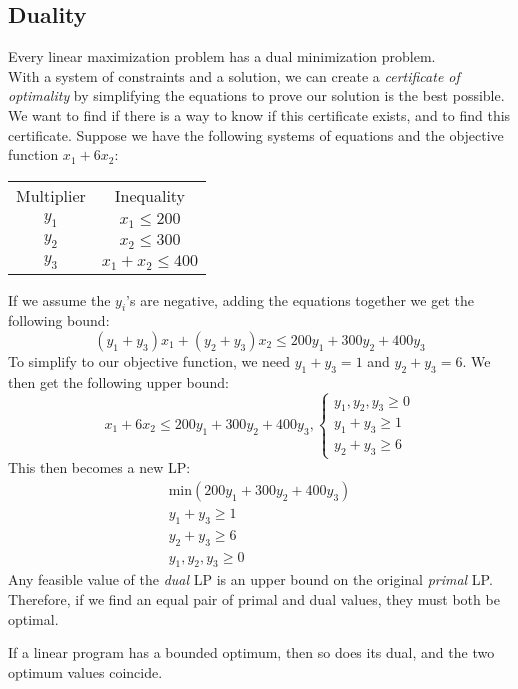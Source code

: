 \subsection{Duality}
Every linear maximization problem has a dual minimization problem.\\
With a system of constraints and a solution, we can create a \textit{certificate of optimality} by simplifying the equations to prove our solution is the best possible.
We want to find if there is a way to know if this certificate exists, and to find this certificate.
Suppose we have the following systems of equations and the objective function $x_1 + 6x_{2}$:
\begin{center}
\begin{tabular}{c c}
  Multiplier & Inequality \\
  $y_1$ & $x_1 \leq 200$\\
  $y_2$ & $x_2 \leq 300$\\
  $y_3$ & $x_1 + x_2 \leq 400$\\
\end{tabular}
\end{center}
If we assume the $y_i$'s are negative, adding the equations together we get the following bound: $$(y_1 + y_{3})x_{1} + (y_{2} + y_{3})x_{2} \leq 200 y_{1} + 300 y_{2} + 400 y_{3}$$
To simplify to our objective function, we need $y_{1} + y_{3} = 1$ and $y_{2} + y_{3} = 6$.
We then get the following upper bound: $$x_{1} + 6x_{2} \leq 200 y_{1} + 300 y_{2} + 400 y_{3}, \begin{cases} y_{1},y_{2},y_{3} \geq 0 \\ y_{1} + y_{3} \geq 1 \\ y_{2} + y_{3} \geq 6 \end{cases}$$
This then becomes a new LP:
\begin{align*}
  \text{min}(200 y_{1} + 300 y_{2} + 400 y_{3})\\
  y_{1} + y_{3} \geq 1\\
  y_{2} + y_{3} \geq 6\\
  y_{1},y_{2},y_{3} \geq 0
\end{align*}
Any feasible value of the \textit{dual} LP is an upper bound on the original \textit{primal} LP.
Therefore, if we find an equal pair of primal and dual values, they must both be optimal.
\begin{theorem}
  If a linear program has a bounded optimum, then so does its dual, and the two optimum values coincide.
\end{theorem}


